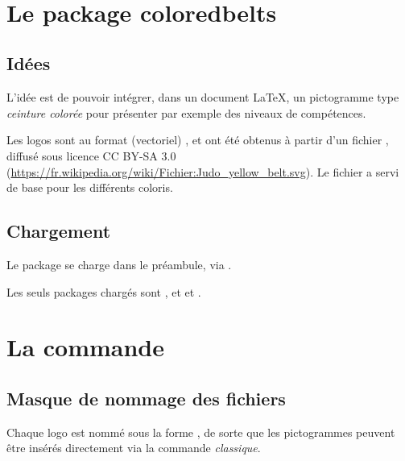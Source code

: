 \documentclass[french,11pt,a4paper]{article}
\begin{document}
\vfill~

\pagebreak

\section{Le package coloredbelts}

\subsection{Idées}

L'idée est de pouvoir intégrer, dans un document \LaTeX, un pictogramme type \textit{ceinture colorée} pour présenter par exemple des niveaux de compétences.

\medskip

Les logos sont au format (vectoriel) , et ont été obtenus à partir d'un fichier , diffusé sous licence CC BY-SA 3.0 (\url{https://fr.wikipedia.org/wiki/Fichier:Judo_yellow_belt.svg}). Le fichier a servi de base pour les différents coloris.

\subsection{Chargement}

Le package se charge dans le préambule, via .

Les seuls packages chargés sont ,  et  et .

\begin{codehigh}[language=latex/latex2,style/main=cyan!10,style/code=cyan!10]
\usepackage{coloredbelts}
\end{codehigh}

\section{La commande}

\subsection{Masque de nommage des fichiers}

Chaque logo est nommé sous la forme , de sorte que les pictogrammes peuvent être insérés directement via la commande  \textit{classique}.
\end{document}
